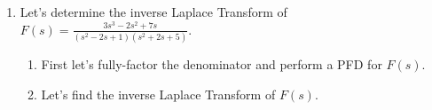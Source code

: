 \documentclass{ximera}
\begin{document}
\begin{enumerate}
\newpage

\item Let's determine the inverse Laplace Transform of $\displaystyle F(s)=\frac{3s^3-2s^2+7s}{(s^2-2s+1)(s^2+2s+5)}$.


\begin{enumerate}
\item First let's fully-factor the denominator and perform a PFD for $F(s)$.


\vfill


\item  Let's  find the inverse Laplace Transform of $F(s)$.

\vfill


\end{enumerate}


\end{enumerate}
\end{document}
